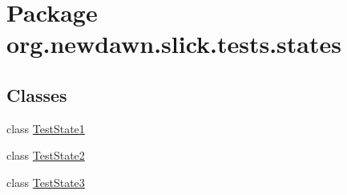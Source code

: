 \hypertarget{namespaceorg_1_1newdawn_1_1slick_1_1tests_1_1states}{}\section{Package org.\+newdawn.\+slick.\+tests.\+states}
\label{namespaceorg_1_1newdawn_1_1slick_1_1tests_1_1states}
\subsection*{Classes}
\begin{DoxyCompactItemize}
\item 
class \mbox{\hyperlink{classorg_1_1newdawn_1_1slick_1_1tests_1_1states_1_1_test_state1}{Test\+State1}}
\item 
class \mbox{\hyperlink{classorg_1_1newdawn_1_1slick_1_1tests_1_1states_1_1_test_state2}{Test\+State2}}
\item 
class \mbox{\hyperlink{classorg_1_1newdawn_1_1slick_1_1tests_1_1states_1_1_test_state3}{Test\+State3}}
\end{DoxyCompactItemize}

